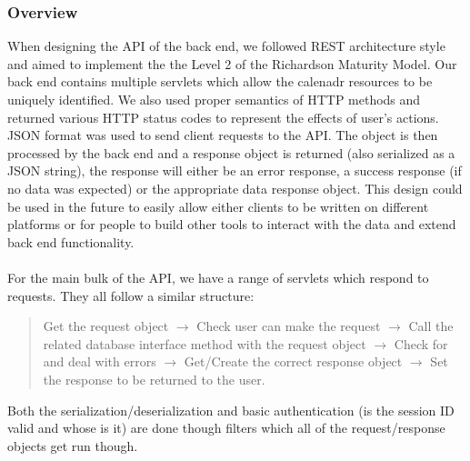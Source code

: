 \documentclass[10pt,a4paper]{article}
\begin{document}
\subsubsection{Overview}
When designing the API of the back end, we followed REST architecture style and 
aimed to implement the the Level 2 of the Richardson Maturity Model. Our back 
end contains multiple servlets which allow the calenadr resources to be uniquely 
identified. We also used proper semantics of HTTP methods and returned various 
HTTP status codes to represent the effects of user's actions. JSON format was 
used to send client requests to the API. The object is then processed by the 
back end and a response object is returned (also serialized as a JSON string), 
the response will either be an error response, a success response (if no data 
was expected) or the appropriate data response object. This design could be used 
in the future to easily allow either clients to be written on different 
platforms or for people to build other tools to interact with the data and 
extend back end functionality. 
\\
\\
\noindent For the main bulk of the API, we have a range of servlets which 
respond to requests. They all follow a similar structure:
\begin{quote}
\centering
Get the request object $\rightarrow$ Check user can make the request 
$\rightarrow$ Call the related database interface method with the request object 
$\rightarrow$ Check for and deal with errors $\rightarrow$ Get/Create the 
correct response object $\rightarrow$ Set the response to be returned to the 
user.
\end{quote}
Both the serialization/deserialization and basic authentication (is the session 
ID valid and whose is it) are done though filters which all of the 
request/response objects get run though.
\\
\\
\end{document}
